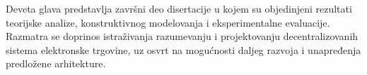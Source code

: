 Deveta glava predstavlja završni deo disertacije u kojem su objedinjeni rezultati teorijske analize, konstruktivnog modelovanja i eksperimentalne evaluacije. Razmatra se doprinos istraživanja razumevanju i projektovanju decentralizovanih sistema elektronske trgovine, uz osvrt na mogućnosti daljeg razvoja i unapređenja predložene arhitekture.